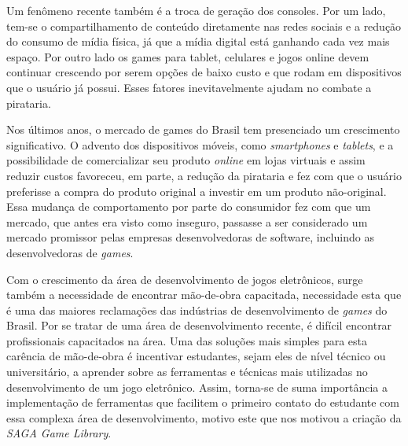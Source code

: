 Um fenômeno recente também é a troca de geração dos consoles. Por um lado, tem-se o compartilhamento de conteúdo diretamente nas redes sociais e a redução do consumo de mídia física, já que a mídia digital está ganhando cada vez mais espaço. Por outro lado os games para tablet, celulares e jogos online devem continuar crescendo por serem opções de baixo custo e que rodam em dispositivos que o usuário já possui. Esses fatores inevitavelmente ajudam no combate a pirataria.
%
%

Nos últimos anos, o mercado de games do Brasil tem presenciado um crescimento significativo. 
O advento dos dispositivos móveis, como \textit{smartphones} e \textit{tablets}, e a possibilidade de comercializar seu produto \textit{online} em lojas virtuais e assim reduzir custos favoreceu, em parte, a redução da pirataria e fez com que o usuário preferisse a compra do produto original a investir em um produto não-original. Essa mudança de comportamento por parte do consumidor fez com que um mercado, que antes era visto como inseguro, passasse a ser considerado um mercado promissor pelas empresas desenvolvedoras de software, incluindo as desenvolvedoras de \textit{games}.
\par
Com o crescimento da área de desenvolvimento de jogos eletrônicos, surge também a necessidade de encontrar mão-de-obra capacitada, necessidade esta que é uma das maiores reclamações das indústrias de desenvolvimento de \textit{games} do Brasil. Por se tratar de uma área de desenvolvimento recente, é difícil encontrar profissionais capacitados na área. Uma das soluções mais simples para esta carência de mão-de-obra é incentivar estudantes, sejam eles de nível técnico ou universitário, a aprender sobre as ferramentas e técnicas mais utilizadas no desenvolvimento de um jogo eletrônico. Assim, torna-se de suma importância a implementação de ferramentas que facilitem o primeiro contato do estudante com essa complexa área de desenvolvimento, motivo este que nos motivou a criação da \textit{SAGA Game Library}.
%
%
